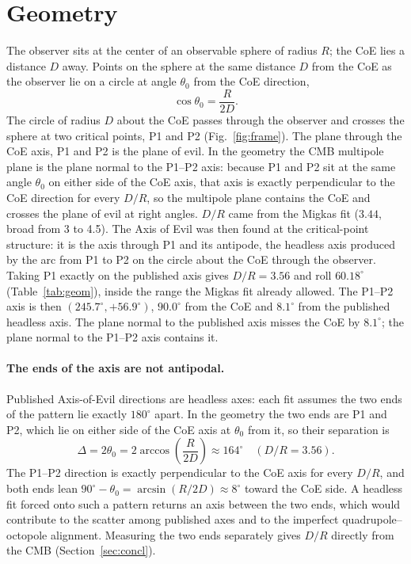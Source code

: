 \documentclass[11pt,a4paper]{article}
\newcommand{\dg}{^\circ}
\begin{document}
\section{Geometry}\label{sec:geom}
The observer sits at the center of an observable sphere of radius $R$; the CoE lies a distance $D$ away. Points on the sphere at the same distance $D$ from the CoE as the observer lie on a circle at angle $\theta_0$ from the CoE direction,
\begin{equation}
\cos\theta_0=\frac{R}{2D}.
\end{equation}
The circle of radius $D$ about the CoE passes through the observer and crosses the sphere at two critical points, P1 and P2 (Fig.~\ref{fig:frame}). The plane through the CoE axis, P1 and P2 is the plane of evil. In the geometry the CMB multipole plane is the plane normal to the P1--P2 axis: because P1 and P2 sit at the same angle $\theta_0$ on either side of the CoE axis, that axis is exactly perpendicular to the CoE direction for every $D/R$, so the multipole plane contains the CoE and crosses the plane of evil at right angles. $D/R$ came from the Migkas fit ($3.44$, broad from 3 to 4.5). The Axis of Evil was then found at the critical-point structure: it is the axis through P1 and its antipode, the headless axis produced by the arc from P1 to P2 on the circle about the CoE through the observer. Taking P1 exactly on the published axis gives $D/R=3.56$ and roll $60.18\dg$ (Table~\ref{tab:geom}), inside the range the Migkas fit already allowed. The P1--P2 axis is then $(245.7\dg,+56.9\dg)$, $90.0\dg$ from the CoE and $8.1\dg$ from the published headless axis. The plane normal to the published axis misses the CoE by $8.1\dg$; the plane normal to the P1--P2 axis contains it.

\paragraph{The ends of the axis are not antipodal.} Published Axis-of-Evil directions are headless axes: each fit assumes the two ends of the pattern lie exactly $180\dg$ apart. In the geometry the two ends are P1 and P2, which lie on either side of the CoE axis at $\theta_0$ from it, so their separation is
\begin{equation}
\Delta=2\theta_0=2\arccos\!\left(\frac{R}{2D}\right)\approx164\dg\quad(D/R=3.56).
\end{equation}
The P1--P2 direction is exactly perpendicular to the CoE axis for every $D/R$, and both ends lean $90\dg-\theta_0=\arcsin(R/2D)\approx8\dg$ toward the CoE side. A headless fit forced onto such a pattern returns an axis between the two ends, which would contribute to the scatter among published axes and to the imperfect quadrupole--octopole alignment. Measuring the two ends separately gives $D/R$ directly from the CMB (Section~\ref{sec:concl}).
\end{document}
